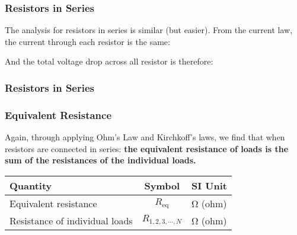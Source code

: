 \documentclass[12pt,aspectratio=169]{beamer}
\newcommand{\eq}[2]{\vspace{#1}{\Large\begin{displaymath}#2\end{displaymath}}}
\begin{document}
\begin{frame}
  \frametitle{Resistors in Series}
  \begin{center}
  \end{center}

  \vspace{.1in}The analysis for resistors in series is similar (but easier).
  From the current law, the current through each resistor is the same:

  \eq{-.2in}{I_1=I_2=I_3=\cdots=I}

  \vspace{-.15in}And the total voltage drop across all resistor is therefore:

  \eq{-.4in}{V=V_1+V_2+V_3+\cdot=I(R_1+R_2+R_3+\cdots)}
\end{frame}

\begin{frame}
  \frametitle{Resistors in Series}
  \frametitle{Equivalent Resistance}
  Again, through applying Ohm's Law and Kirchkoff's laws, we find that when
  resistors are connected in series: \textbf{the equivalent resistance of loads
    is the sum of the resistances of the individual loads.}

  \eq{-.2in}{
    \boxed{R_\mathrm{eq}=R_1 + R_2 + \cdots + R_N}
  }

  \begin{center}
    \begin{tabular}{l|c|l}
      \rowcolor{pink}
      \textbf{Quantity} & \textbf{Symbol} & \textbf{SI Unit} \\ \hline
      Equivalent resistance          & $R_\mathrm{eq}$ & \si{\ohm} (ohm) \\
      Resistance of individual loads & $R_{1,2,3,\cdots,N}$ & \si{\ohm} (ohm) \\
    \end{tabular}
  \end{center}
\end{frame}
\end{document}
